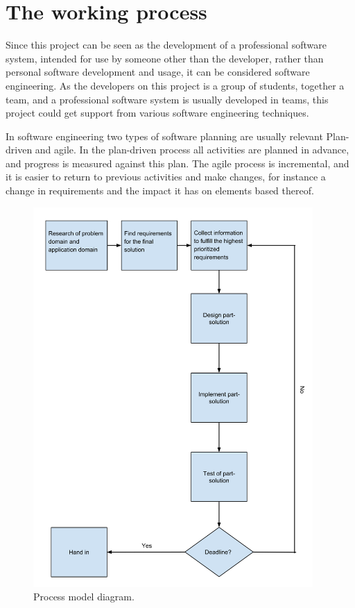 \chapter{The working process}
Since this project can be seen as the development of a professional software system, intended for use by someone other than the developer, rather than personal software development and usage, it can be considered software engineering\cite{sommerville9ed}. As the developers on this project is a group of students, together a team, and a professional software system is usually developed in teams, this project could get support from various software engineering techniques.

In software engineering two types of software planning are usually relevant\cite{sommerville9ed} Plan-driven and agile. In the plan-driven process all activities are planned in advance, and progress is measured against this plan\cite{sommerville9ed}. The agile process is incremental, and it is easier to return to previous activities and make changes, for instance a change in requirements and the impact it has on elements based thereof.

\begin{figure}[h!]
\centering
\includegraphics[width=0.95\textwidth]{figures/ProcessmodelDiagram.png}
\caption{Process model diagram.}
\label{fig:processmodelDiagram}
\end{figure}

